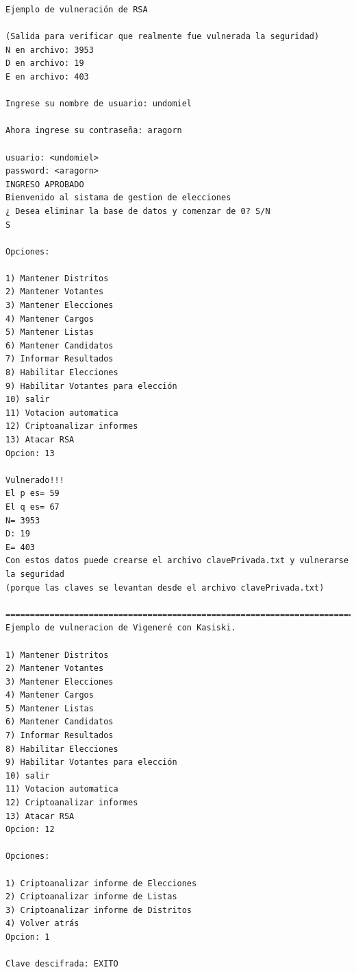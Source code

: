 \documentclass[a4paper,10pt]{article}
\begin{document}
\begin{verbatim}
Ejemplo de vulneración de RSA

(Salida para verificar que realmente fue vulnerada la seguridad)
N en archivo: 3953
D en archivo: 19
E en archivo: 403

Ingrese su nombre de usuario: undomiel

Ahora ingrese su contraseña: aragorn

usuario: <undomiel>
password: <aragorn>
INGRESO APROBADO
Bienvenido al sistama de gestion de elecciones
¿ Desea eliminar la base de datos y comenzar de 0? S/N
S

Opciones: 

1) Mantener Distritos
2) Mantener Votantes
3) Mantener Elecciones
4) Mantener Cargos
5) Mantener Listas
6) Mantener Candidatos
7) Informar Resultados
8) Habilitar Elecciones
9) Habilitar Votantes para elección
10) salir
11) Votacion automatica
12) Criptoanalizar informes
13) Atacar RSA
Opcion: 13

Vulnerado!!!
El p es= 59
El q es= 67
N= 3953
D: 19
E= 403
Con estos datos puede crearse el archivo clavePrivada.txt y vulnerarse la seguridad
(porque las claves se levantan desde el archivo clavePrivada.txt)

================================================================================================
Ejemplo de vulneracion de Vigeneré con Kasiski.

1) Mantener Distritos
2) Mantener Votantes
3) Mantener Elecciones
4) Mantener Cargos
5) Mantener Listas
6) Mantener Candidatos
7) Informar Resultados
8) Habilitar Elecciones
9) Habilitar Votantes para elección
10) salir
11) Votacion automatica
12) Criptoanalizar informes
13) Atacar RSA
Opcion: 12

Opciones: 

1) Criptoanalizar informe de Elecciones
2) Criptoanalizar informe de Listas
3) Criptoanalizar informe de Distritos
4) Volver atrás
Opcion: 1

Clave descifrada: EXITO


\end{verbatim}
\end{document}
